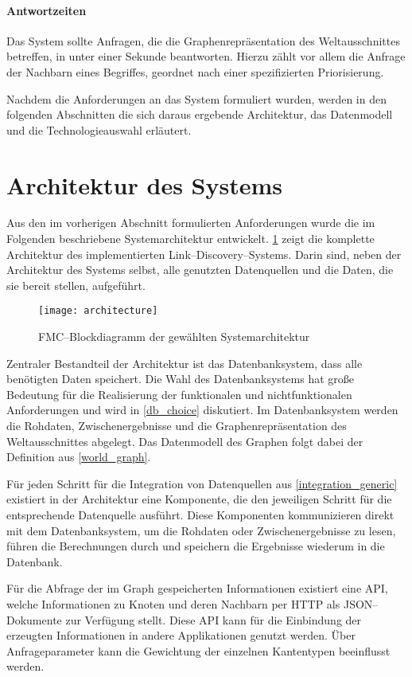 \paragraph{Antwortzeiten} Das System sollte Anfragen, die die Graphenrepräsentation des Weltausschnittes betreffen, in unter einer Sekunde beantworten. Hierzu zählt vor allem die Anfrage der Nachbarn eines Begriffes, geordnet nach einer spezifizierten Priorisierung.

Nachdem die Anforderungen an das System formuliert wurden, werden in den folgenden Abschnitten die sich daraus ergebende Architektur, das Datenmodell und die Technologieauswahl erläutert.

\section{Architektur des Systems}

Aus den im vorherigen Abschnitt formulierten Anforderungen wurde die im Folgenden beschriebene Systemarchitektur entwickelt. \cref{fig:architecture} zeigt die komplette Architektur des implementierten Link--Discovery--Systems. Darin sind, neben der Architektur des Systems selbst, alle genutzten Datenquellen und die Daten, die sie bereit stellen, aufgeführt.

\begin{figure}[ht]
\centering
\texttt{[image: architecture]}
\caption{FMC--Blockdiagramm der gewählten Systemarchitektur}
\label{fig:architecture}
\end{figure}

Zentraler Bestandteil der Architektur ist das Datenbanksystem, dass alle benötigten Daten speichert. Die Wahl des Datenbanksystems hat große Bedeutung für die Realisierung der funktionalen und nichtfunktionalen Anforderungen und wird in \cref{db_choice} diskutiert. Im Datenbanksystem werden die Rohdaten, Zwischenergebnisse und die Graphenrepräsentation des Weltausschnittes abgelegt. Das Datenmodell des Graphen folgt dabei der Definition aus \cref{world_graph}.

Für jeden Schritt für die Integration von Datenquellen aus \cref{integration_generic} existiert in der Architektur eine Komponente, die den jeweiligen Schritt für die entsprechende Datenquelle ausführt. Diese Komponenten kommunizieren direkt mit dem Datenbanksystem, um die Rohdaten oder Zwischenergebnisse zu lesen, führen die Berechnungen durch und speichern die Ergebnisse wiederum in die Datenbank.

Für die Abfrage der im Graph gespeicherten Informationen existiert eine API, welche Informationen zu Knoten und deren Nachbarn per HTTP als JSON--Dokumente \cite{json2006} zur Verfügung stellt. Diese API kann für die Einbindung der erzeugten Informationen in andere Applikationen genutzt werden. Über Anfrageparameter kann die Gewichtung der einzelnen Kantentypen beeinflusst werden.

